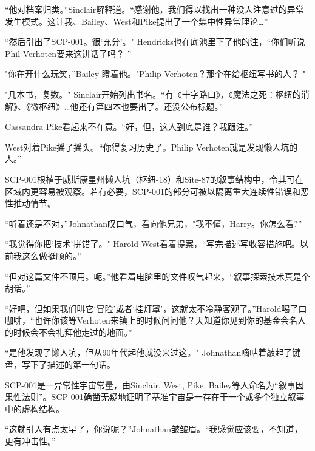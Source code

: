 “他对档案归类。”Sinclair解释道。“感谢他，我们得以找出一种没人注意过的异常发生模式。这让我、Bailey、West和Pike提出了一个集中性异常理论…”

“然后引出了SCP-001。很‘充分’。" Hendricks也在底池里下了他的注，“你们听说Phil Verhoten要来这讲话了吗？ ”

"你在开什么玩笑，”Bailey 瞪着他。"Philip Verhoten？那个在给枢纽写书的人？ "

"几本书，复数。" Sinclair开始列出书名。“有《十字路口》，《魔法之死：枢纽的消解》、《微枢纽》…他还有第四本也要出了。还没公布标题。”

Cassandra Pike看起来不在意。“好，但，这人到底是谁？我跟注。”

West对着Pike摇了摇头。“你得复习历史了。Philip Verhoten就是发现懒人坑的人。”

\hr

\begin{scpbox}

SCP-001根植于威斯康星州懒人坑（枢纽-18）和Site-87的叙事结构中，令其可在区域内更容易被观察。若有必要，SCP-001的部分可被以隔离重大连续性错误和恶性推动情节。

\end{scpbox}

“听着还是不对，”Johnathan叹口气，看向他兄弟，"我不懂，Harry。你怎么看?”

“我觉得你把‘技术’拼错了。" Harold West看着提案，“写完描述写收容措施吧。以前我这么做挺顺的。”

“但对这篇文件不顶用。呃。”他看着电脑里的文件叹气起来。“叙事探索技术真是个胡话。”

“好吧，但如果我们叫它‘冒险’或者‘挂灯罩’，这就太不冷静客观了。”Harold喝了口咖啡，“也许你该等Verhoten来镇上的时候问问他？天知道你见到你的基金会名人的时候会不会礼拜他走过的地面。”

“是他发现了懒人坑，但从90年代起他就没来过这。" Johnathan嘀咕着敲起了键盘，写下了描述的第一句话。

\begin{scpbox}

SCP-001是一异常性宇宙常量，由Sinclair, West, Pike, Bailey等人命名为“叙事因果性法则”。SCP-001确凿无疑地证明了基准宇宙是一存在于一个或多个独立叙事中的虚构结构。

\end{scpbox}

“这就引入有点太早了，你说呢？”Johnathan皱皱眉。“我感觉应该要，不知道，更有冲击性。”

